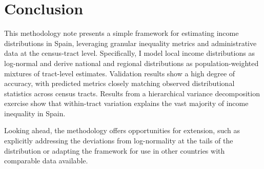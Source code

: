 \documentclass[letterpaper,11pt,leqno]{article}
\begin{document}


\section{Conclusion}\label{sec:conc}

This methodology note presents a simple framework for estimating income distributions in Spain, leveraging granular inequality metrics and administrative data at the census-tract level. Specifically, I model local income distributions as log-normal and derive national and regional distributions as population-weighted mixtures of tract-level estimates. Validation results show a high degree of accuracy, with predicted metrics closely matching observed distributional statistics across census tracts. Results from a hierarchical variance decomposition exercise show that within-tract variation explains the vast majority of income inequality in Spain.


Looking ahead, the methodology offers opportunities for extension, such as explicitly addressing the deviations from log-normality at the tails of the distribution or adapting the framework for use in other countries with comparable data available. 

\newpage
\singlespacing


\end{document}
